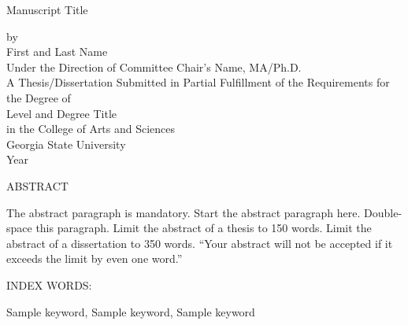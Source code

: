 \pagestyle{empty}
\begin{center}
Manuscript Title %



\vspace{1.4in}
by\\
\vspace{1.4in}
First and Last Name\\ %
\vspace{1.4in}
Under the Direction of Committee Chair's Name, MA/Ph.D. \\ %
\vspace{1.4in}
A Thesis/Dissertation Submitted in Partial Fulfillment of the Requirements for the Degree of\\  %
\vspace{.2in}
Level and Degree Title \\ %
\vspace{.2in}
in the College of Arts and Sciences \\
\vspace{.2in}
Georgia State University \\
\vspace{.2in}
Year

\end{center}

\pagebreak 


\begin{center}
    ABSTRACT\\ 
\end{center}

\doublespacing
The abstract paragraph is mandatory. Start the abstract paragraph here. Double-space this paragraph. Limit the abstract of a thesis to 150 words. Limit the abstract of a dissertation to 350 words. ``Your abstract will not be accepted if it exceeds the limit by even one word.''

\begin{singlespace}
\vfill   
\vspace{0.5in}
\noindent INDEX WORDS:
\hspace{0in}
\parbox[t]{4.5in}{
Sample keyword, Sample keyword, Sample keyword}  %
\end{singlespace} 